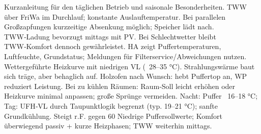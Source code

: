 \markdownRendererDocumentBegin
\markdownRendererSectionBegin
{}\markdownRendererInterblockSeparator
{}Kurzanleitung für den täglichen Betrieb und saisonale Besonderheiten.\markdownRendererInterblockSeparator
{}\markdownRendererSectionBegin
{}\markdownRendererInterblockSeparator
{}\markdownRendererUlBeginTight
\markdownRendererUlItem TWW über FriWa im Durchlauf; konstante Auslauftemperatur. Bei parallelen Großzapfungen kurzzeitige Absenkung möglich; Speicher lädt nach.\markdownRendererUlItemEnd 
\markdownRendererUlItem TWW‑Ladung bevorzugt mittags mit PV. Bei Schlechtwetter bleibt TWW‑Komfort dennoch gewährleistet.\markdownRendererUlItemEnd 
\markdownRendererUlItem HA zeigt Puffertemperaturen, Luftfeuchte, Grundstatus; Meldungen für Filterservice/Abweichungen nutzen.\markdownRendererUlItemEnd 
\markdownRendererUlEndTight \markdownRendererInterblockSeparator
{}
\markdownRendererSectionEnd \markdownRendererSectionBegin
{}\markdownRendererInterblockSeparator
{}\markdownRendererUlBeginTight
\markdownRendererUlItem Wettergeführte Heizkurve mit niedrigen VL (~28–35 °C). Strahlungswärme baut sich träge, aber behaglich auf.\markdownRendererUlItemEnd 
\markdownRendererUlItem Holzofen nach Wunsch: hebt Puffertop an, WP reduziert Leistung.\markdownRendererUlItemEnd 
\markdownRendererUlItem Bei zu kühlen Räumen: Raum‑Soll leicht erhöhen oder Heizkurve minimal anpassen; große Sprünge vermeiden.\markdownRendererUlItemEnd 
\markdownRendererUlEndTight \markdownRendererInterblockSeparator
{}
\markdownRendererSectionEnd \markdownRendererSectionBegin
{}\markdownRendererInterblockSeparator
{}\markdownRendererUlBeginTight
\markdownRendererUlItem Nacht: Puffer ~16–18 °C; Tag: UFH‑VL durch Taupunktlogik begrenzt (typ. 19–21 °C); sanfte Grundkühlung.\markdownRendererUlItemEnd 
\markdownRendererUlItem Steigt r.F. gegen 60 \markdownRendererUlItemEnd 
\markdownRendererUlEndTight \markdownRendererInterblockSeparator
{}
\markdownRendererSectionEnd \markdownRendererSectionBegin
{}\markdownRendererInterblockSeparator
{}\markdownRendererUlBeginTight
\markdownRendererUlItem Niedrige Puffersollwerte; Komfort überwiegend passiv + kurze Heizphasen; TWW weiterhin mittags.\markdownRendererUlItemEnd 
\markdownRendererUlEndTight \markdownRendererInterblockSeparator
{}
\markdownRendererSectionEnd \markdownRendererSectionBegin
{}\markdownRendererInterblockSeparator
